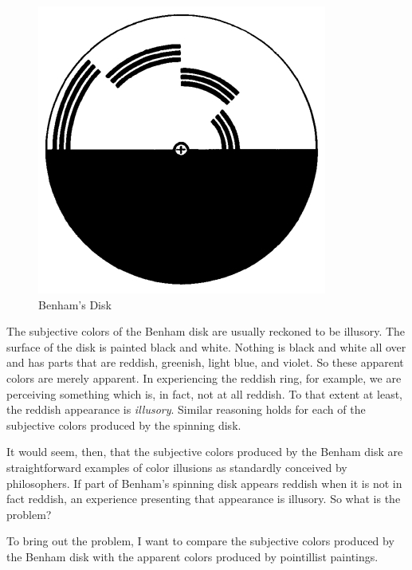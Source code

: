 \documentclass[12pt]{article}
\begin{document}
\begin{figure}[htbp]
	\centering
		\includegraphics[scale=.5]{graphics/benhams_disk.jpg}
	\caption{Benham's Disk}
	\label{fig:benham}
\end{figure}

The subjective colors of the Benham disk are usually reckoned to be illusory. The surface of the disk is painted black and white. Nothing is black and white all over and has parts that are reddish, greenish, light blue, and violet. So these apparent colors are merely apparent. In experiencing the reddish ring, for example, we are perceiving something which is, in fact, not at all reddish. To that extent at least, the reddish appearance is \emph{illusory}. Similar reasoning holds for each of the subjective colors produced by the spinning disk.

It would seem, then, that the subjective colors produced by the Benham disk are straightforward examples of color illusions as standardly conceived by philosophers. If part of Benham's spinning disk appears reddish when it is not in fact reddish, an experience presenting that appearance is illusory. So what is the problem? 

To bring out the problem, I want to compare the subjective colors produced by the Benham disk with the apparent colors produced by pointillist paintings.
\end{document}

